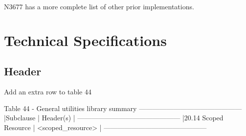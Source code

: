 \documentclass[ebook,11pt,article]{memoir}
\begin{document}
N3677 has a more complete list of other prior implementations.

\chapter{Technical Specifications}
\section{Header}
Add an extra row to table 44
\begin{codeblock}
Table 44 - General utilities library summary
---------------------------------------------
|Subclause             |  Header(s)         |
---------------------------------------------
|20.14 Scoped Resource | <scoped_resource>  |
---------------------------------------------
\end{codeblock}
\end{document}
